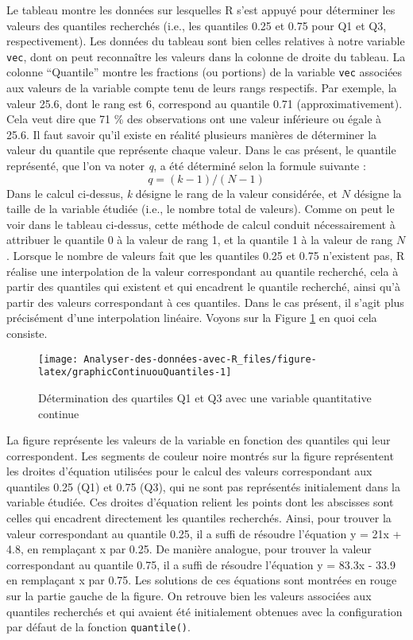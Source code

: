 \documentclass[
  french,
]{book}
\begin{document}
Le tableau montre les données sur lesquelles R s'est appuyé pour déterminer les valeurs des quantiles recherchés (i.e., les quantiles 0.25 et 0.75 pour Q1 et Q3, respectivement). Les données du tableau sont bien celles relatives à notre variable \texttt{vec}, dont on peut reconnaître les valeurs dans la colonne de droite du tableau. La colonne \enquote{Quantile} montre les fractions (ou portions) de la variable \texttt{vec} associées aux valeurs de la variable compte tenu de leurs rangs respectifs. Par exemple, la valeur 25.6, dont le rang est 6, correspond au quantile 0.71 (approximativement). Cela veut dire que 71 \% des observations ont une valeur inférieure ou égale à 25.6. Il faut savoir qu'il existe en réalité plusieurs manières de déterminer la valeur du quantile que représente chaque valeur. Dans le cas présent, le quantile représenté, que l'on va noter \emph{q}, a été déterminé selon la formule suivante :
\[q = (k - 1 ) / (N - 1)\]
Dans le calcul ci-dessus, \emph{k} désigne le rang de la valeur considérée, et \(N\) désigne la taille de la variable étudiée (i.e., le nombre total de valeurs). Comme on peut le voir dans le tableau ci-dessus, cette méthode de calcul conduit nécessairement à attribuer le quantile 0 à la valeur de rang 1, et la quantile 1 à la valeur de rang \(N\). Lorsque le nombre de valeurs fait que les quantiles 0.25 et 0.75 n'existent pas, R réalise une interpolation de la valeur correspondant au quantile recherché, cela à partir des quantiles qui existent et qui encadrent le quantile recherché, ainsi qu'à partir des valeurs correspondant à ces quantiles. Dans le cas présent, il s'agit plus précisément d'une interpolation linéaire. Voyons sur la Figure \ref{fig:graphicContinuouQuantiles} en quoi cela consiste.

\begin{figure}

{\centering \texttt{[image: Analyser-des-données-avec-R\_files/figure-latex/graphicContinuouQuantiles-1]} 

}

\caption{Détermination des quartiles Q1 et Q3 avec une variable quantitative continue}\label{fig:graphicContinuouQuantiles}
\end{figure}

La figure représente les valeurs de la variable en fonction des quantiles qui leur correspondent. Les segments de couleur noire montrés sur la figure représentent les droites d'équation utilisées pour le calcul des valeurs correspondant aux quantiles 0.25 (Q1) et 0.75 (Q3), qui ne sont pas représentés initialement dans la variable étudiée. Ces droites d'équation relient les points dont les abscisses sont celles qui encadrent directement les quantiles recherchés. Ainsi, pour trouver la valeur correspondant au quantile 0.25, il a suffi de résoudre l'équation y = 21x + 4.8, en remplaçant x par 0.25. De manière analogue, pour trouver la valeur correspondant au quantile 0.75, il a suffi de résoudre l'équation y = 83.3x - 33.9 en remplaçant x par 0.75. Les solutions de ces équations sont montrées en rouge sur la partie gauche de la figure. On retrouve bien les valeurs associées aux quantiles recherchés et qui avaient été initialement obtenues avec la configuration par défaut de la fonction \texttt{quantile()}.
\end{document}
